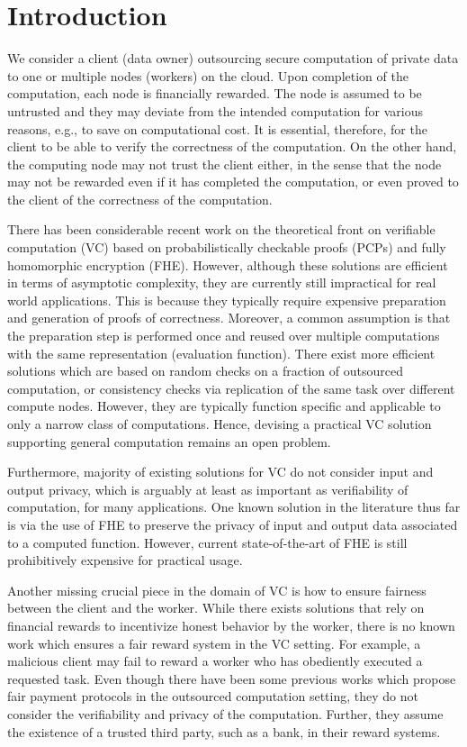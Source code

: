 \section{Introduction} \label{sect:intro}

We consider a client (data owner) outsourcing secure computation of private data to one or multiple nodes (workers) on the cloud. 
Upon completion of the computation, each node is financially rewarded. 
The node is assumed to be untrusted and they may deviate from the intended computation for various reasons, e.g., to save on computational cost. 
It is essential, therefore, for the client to be able to verify the correctness of the computation. 
On the other hand, the computing node may not trust the client either, in the sense that the node may not be rewarded even if it has completed the computation, or even proved to the client of the correctness of the computation.

There has been considerable recent work on the theoretical front on verifiable computation (VC) based on probabilistically checkable proofs (PCPs) and fully homomorphic encryption (FHE). 
However, although these solutions are efficient in terms of asymptotic complexity, they are currently still impractical for real world applications. This is because they typically require expensive preparation and generation of proofs of correctness. 
Moreover, a common assumption is that the preparation step is performed once and reused over multiple computations with the same representation (evaluation function).
There exist more efficient solutions which are based on random checks on a fraction of outsourced computation, or consistency checks via replication of the same task over different compute nodes.
However, they are typically function specific and applicable to only a narrow class of computations.
Hence, devising a practical VC solution supporting general computation remains an open problem.

Furthermore, majority of existing solutions for VC do not consider input and output privacy, which is arguably at least as important as verifiability of computation, for many applications.
One known solution in the literature thus far is via the use of FHE to preserve the privacy of input and output data associated to a computed function.
However, current state-of-the-art of FHE is still prohibitively expensive for practical usage.

Another missing crucial piece in the domain of VC is how to ensure fairness between the client and the worker.
While there exists solutions that rely on financial rewards to incentivize honest behavior by the worker, there is no known work which ensures a fair reward system in the VC setting.
For example, a malicious client may fail to reward a worker who has obediently executed a requested task.
Even though there have been some previous works which propose fair payment protocols in the outsourced computation setting, they do not consider the verifiability and privacy of the computation.
Further, they assume the existence of a trusted third party, such as a bank, in their reward systems.

